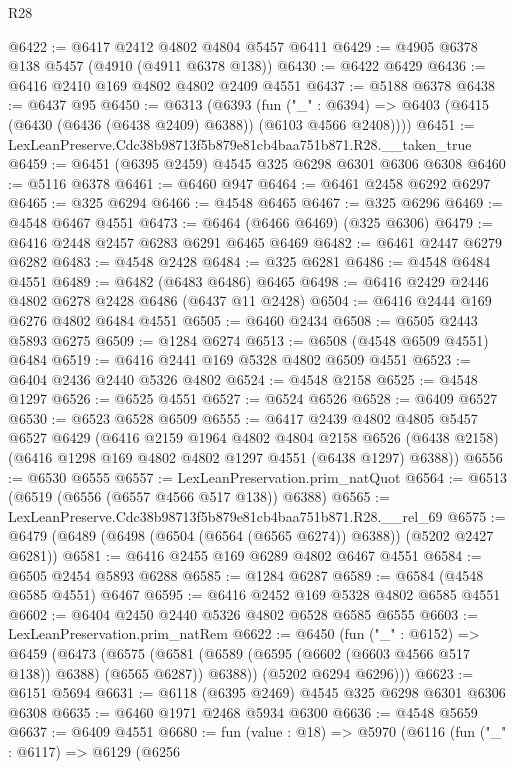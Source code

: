 \begin{lexlean}{R28}
\begin{coremodule}
@6422 := @6417 @2412 @4802 @4804 @5457 @6411
@6429 := @4905 @6378 @138 @5457 (@4910 (@4911 @6378 @138))
@6430 := @6422 @6429
@6436 := @6416 @2410 @169 @4802 @4802 @2409 @4551
@6437 := @5188 @6378
@6438 := @6437 @95
@6450 := @6313
    (@6393
      (fun ("_" : @6394) => @6403 (@6415 (@6430 (@6436 (@6438 @2409) @6388)) (@6103 @4566 @2408))))
@6451 := LexLeanPreserve.Cdc38b98713f5b879e81cb4baa751b871.R28.__taken_true
@6459 := @6451 (@6395 @2459) @4545 @325 @6298 @6301 @6306 @6308
@6460 := @5116 @6378
@6461 := @6460 @947
@6464 := @6461 @2458 @6292 @6297
@6465 := @325 @6294
@6466 := @4548 @6465
@6467 := @325 @6296
@6469 := @4548 @6467 @4551
@6473 := @6464 (@6466 @6469) (@325 @6306)
@6479 := @6416 @2448 @2457 @6283 @6291 @6465 @6469
@6482 := @6461 @2447 @6279 @6282
@6483 := @4548 @2428
@6484 := @325 @6281
@6486 := @4548 @6484 @4551
@6489 := @6482 (@6483 @6486) @6465
@6498 := @6416 @2429 @2446 @4802 @6278 @2428 @6486 (@6437 @11 @2428)
@6504 := @6416 @2444 @169 @6276 @4802 @6484 @4551
@6505 := @6460 @2434
@6508 := @6505 @2443 @5893 @6275
@6509 := @1284 @6274
@6513 := @6508 (@4548 @6509 @4551) @6484
@6519 := @6416 @2441 @169 @5328 @4802 @6509 @4551
@6523 := @6404 @2436 @2440 @5326 @4802
@6524 := @4548 @2158
@6525 := @4548 @1297
@6526 := @6525 @4551
@6527 := @6524 @6526
@6528 := @6409 @6527
@6530 := @6523 @6528 @6509
@6555 := @6417
    @2439
    @4802
    @4805
    @5457
    @6527
    @6429
    (@6416
      @2159
      @1964
      @4802
      @4804
      @2158
      @6526
      (@6438 @2158)
      (@6416 @1298 @169 @4802 @4802 @1297 @4551 (@6438 @1297) @6388))
@6556 := @6530 @6555
@6557 := LexLeanPreservation.prim_natQuot
@6564 := @6513 (@6519 (@6556 (@6557 @4566 @517 @138)) @6388)
@6565 := LexLeanPreserve.Cdc38b98713f5b879e81cb4baa751b871.R28.__rel_69
@6575 := @6479 (@6489 (@6498 (@6504 (@6564 (@6565 @6274)) @6388)) (@5202 @2427 @6281))
@6581 := @6416 @2455 @169 @6289 @4802 @6467 @4551
@6584 := @6505 @2454 @5893 @6288
@6585 := @1284 @6287
@6589 := @6584 (@4548 @6585 @4551) @6467
@6595 := @6416 @2452 @169 @5328 @4802 @6585 @4551
@6602 := @6404 @2450 @2440 @5326 @4802 @6528 @6585 @6555
@6603 := LexLeanPreservation.prim_natRem
@6622 := @6450
    (fun ("_" : @6152) =>
    @6459
      (@6473
        (@6575 (@6581 (@6589 (@6595 (@6602 (@6603 @4566 @517 @138)) @6388) (@6565 @6287)) @6388))
        (@5202 @6294 @6296)))
@6623 := @6151 @5694
@6631 := @6118 (@6395 @2469) @4545 @325 @6298 @6301 @6306 @6308
@6635 := @6460 @1971 @2468 @5934 @6300
@6636 := @4548 @5659
@6637 := @6409 @4551
@6680 := fun (value : @18) =>
  @5970
    (@6116
      (fun ("_" : @6117) =>
      @6129
        (@6256

\end{coremodule}
\end{lexlean}
